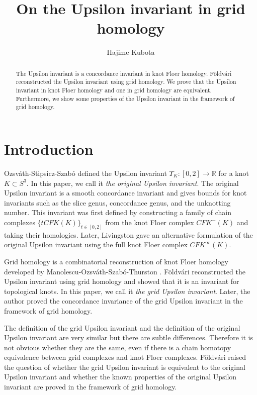 \documentclass[12pt]{amsart}
\title{On the Upsilon invariant in grid homology}
\author{Hajime Kubota}
\date{}
\theoremstyle{plain}
\theoremstyle{definition}
\theoremstyle{plain}
\theoremstyle{definition}
\numberwithin{equation}{section}
\begin{document}
\begin{abstract}
The Upsilon invariant is a concordance invariant in knot Floer homology.
F\"{o}ldv\'{a}ri \cite{The-knot-invariant-Upsilon-using-grid-homologies} reconstructed the Upsilon invariant using grid homology.
We prove that the Upsilon invariant in knot Floer homology and one in grid homology are equivalent.
Furthermore, we show some properties of the Upsilon invariant in the framework of grid homology.
\end{abstract}

\maketitle

\section{Introduction}

Ozsv\'{a}th-Stipsicz-Szab\'{o} \cite{Concordance-homomorphisms-from-knot-Floer-homology} defined the Upsilon invariant $\Upsilon_K\colon[0,2]\to\mathbb{R}$ for a knot $K\subset S^3$.
In this paper, we call it \textit{the original Upsilon invariant}.
The original Upsilon invariant is a smooth concordance invariant and gives bounds for knot invariants such as the slice genus, concordance genus, and the unknotting number.
This invariant was first defined by constructing a family of chain complexes $\{tCFK(K)\}_{t\in[0,2]}$ from the knot Floer complex $CFK^-(K)$ and taking their homologies.
Later, Livingston \cite{Notes-on-the-knot-concordance-invariant-upsilon} gave an alternative formulation of the original Upsilon invariant using the full knot Floer complex $CFK^\infty(K)$.

Grid homology is a combinatorial reconstruction of knot Floer homology developed by Manolescu-Ozsv\'{a}th-Szab\'{o}-Thurston \cite{oncombinatorial}.
F\"{o}ldv\'{a}ri \cite{The-knot-invariant-Upsilon-using-grid-homologies} reconstructed the Upsilon invariant using grid homology and showed that it is an invariant for topological knots.
In this paper, we call it \textit{the grid Upsilon invariant}.
Later, the author \cite{Concordance-invariant-Upsilon-for-balanced-spatial-graphs-using-grid-homology} proved the concordance invariance of the grid Upsilon invariant in the framework of grid homology.

The definition of the grid Upsilon invariant and the definition of the original Upsilon invariant are very similar but there are subtle differences.
Therefore it is not obvious whether they are the same, even if there is a chain homotopy equivalence between grid complexes and knot Floer complexes.
F\"{o}ldv\'{a}ri \cite{The-knot-invariant-Upsilon-using-grid-homologies} raised the question of whether the grid Upsilon invariant is equivalent to the original Upsilon invariant and whether the known properties of the original Upsilon invariant are proved in the framework of grid homology.
\end{document}

